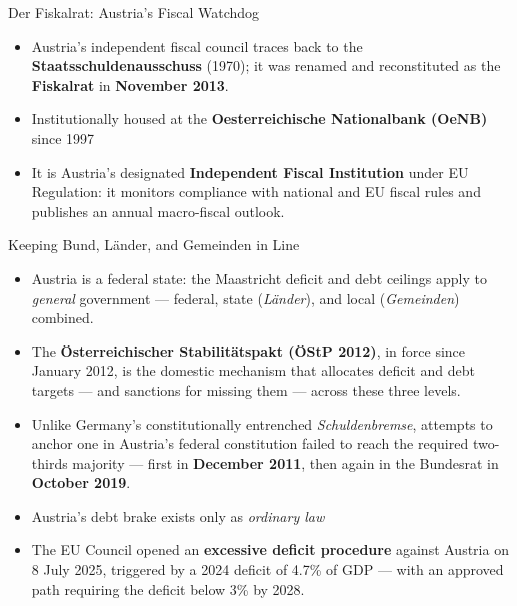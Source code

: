 \documentclass[11pt,aspectratio=169]{beamer}
\begin{document}
 

\begin{frame}{Der Fiskalrat: Austria's Fiscal Watchdog}
  
  \begin{itemize}
    \item Austria's independent fiscal council traces back to the \textbf{Staatsschuldenausschuss} (1970); it was renamed and reconstituted as the \textbf{Fiskalrat} in \textbf{November 2013}.
    \item Institutionally housed at the \textbf{Oesterreichische Nationalbank (OeNB)} since 1997 
    \item It is Austria's designated \textbf{Independent Fiscal Institution} under EU Regulation: it monitors compliance with national and EU fiscal rules and publishes an annual macro-fiscal outlook.
  \end{itemize}
 
\end{frame}

\begin{frame}{Keeping Bund, Länder, and Gemeinden in Line}
  \small
  \begin{itemize}
    \item Austria is a federal state: the Maastricht deficit and debt ceilings apply to \emph{general} government --- federal, state (\emph{Länder}), and local (\emph{Gemeinden})  combined.
    \item The \textbf{Österreichischer Stabilitätspakt (ÖStP 2012)}, in force since January 2012, is the domestic mechanism that allocates deficit and debt targets --- and sanctions for missing them --- across these three levels.
   \item  Unlike Germany's constitutionally entrenched \emph{Schuldenbremse}, attempts to anchor one in Austria's federal constitution failed to reach the required two-thirds majority --- first in \textbf{December 2011}, then again in the Bundesrat in \textbf{October 2019}. 
   \item Austria's debt brake exists only as \emph{ordinary law}  
   \item The EU Council opened an \textbf{excessive deficit procedure} against Austria on 8 July 2025, triggered by a 2024 deficit of 4.7\% of GDP --- with an approved path requiring the deficit below 3\% by 2028.
  \end{itemize}
 
\end{frame}

 
\end{document}
